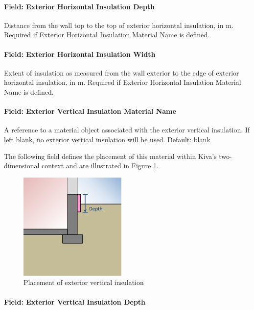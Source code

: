 \paragraph{Field: Exterior Horizontal Insulation
Depth}

Distance from the wall top to the top of exterior horizontal insulation,
in m. Required if Exterior Horizontal Insulation Material Name is
defined.

\paragraph{Field: Exterior Horizontal Insulation
Width}

Extent of insulation as measured from the wall exterior to the edge of
exterior horizontal insulation, in m. Required if Exterior Horizontal
Insulation Material Name is defined.

\paragraph{Field: Exterior Vertical Insulation Material
Name}

A reference to a material object associated with the exterior vertical
insulation. If left blank, no exterior vertical insulation will be used.
Default: blank

The following field defines the placement of this material within Kiva's
two-dimensional context and are illustrated in Figure \ref{fig:evi}.

\begin{figure}
\centering
\includegraphics{media/kiva-2d-evi.png}
\caption{Placement of exterior vertical insulation\label{fig:evi}}
\end{figure}

\paragraph{Field: Exterior Vertical Insulation
Depth}

